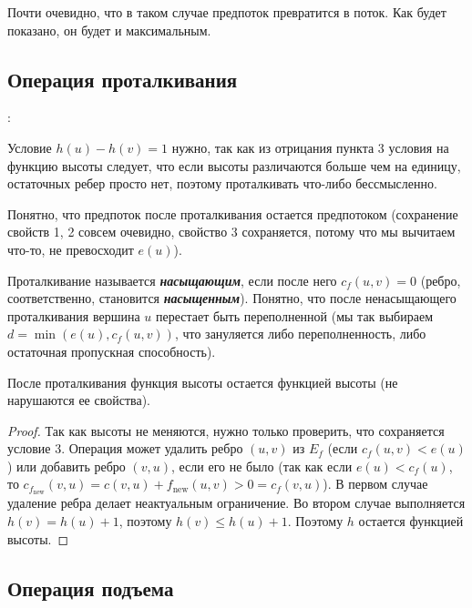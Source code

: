 Почти очевидно, что в таком случае предпоток превратится в поток. Как будет показано, он будет и максимальным.

\subsection{Операция проталкивания}

\begin{algorithm}
:\\
\end{algorithm}
Условие $h(u)-h(v)=1$ нужно, так как из отрицания пункта 3 условия на функцию высоты следует, что если высоты различаются больше чем на единицу, остаточных ребер просто нет, поэтому проталкивать что-либо бессмысленно.

Понятно, что предпоток после проталкивания остается предпотоком (сохранение свойств 1, 2 совсем очевидно, свойство 3 сохраняется, потому что мы вычитаем что-то, не превосходит $e(u)$\label{someshit7}).

Проталкивание называется {\bf\it насыщающим}, если после него $c_f(u,v)=0$ (ребро, соответственно, становится {\bf\it насыщенным}). Понятно, что после ненасыщающего проталкивания вершина $u$ перестает быть переполненной (мы так выбираем $d=\min(e(u), c_f(u,v))$, что зануляется либо переполненность, либо остаточная пропускная способность).

\begin{lemma}
	После проталкивания функция высоты остается функцией высоты (не нарушаются ее свойства).
\end{lemma}
\begin{proof}
	Так как высоты не меняются, нужно только проверить, что сохраняется условие 3. Операция может удалить ребро $(u,v)$ из $E_f$ (если $c_f(u,v)<e(u)$) или добавить ребро $(v,u)$, если его не было (так как если $e(u)<c_f(u)$, то $c_{f_\mathrm{new}}(v,u)=c(v,u)+f_\mathrm{new}(u,v)>0=c_f(v,u)$). В первом случае удаление ребра делает неактуальным ограничение. Во втором случае выполняется $h(v)=h(u)+1$, поэтому $h(v)\le h(u)+1$. Поэтому $h$ остается функцией высоты.
\end{proof}
\subsection{Операция подъема}

